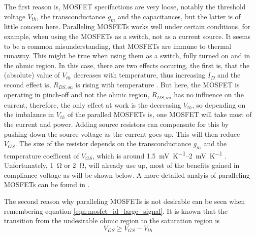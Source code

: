 The first reason is, MOSFET specifactions are very loose, notably the threshold voltage $V_{th}$, the transconductance $g_m$ and the capacitances, but the latter is of little concern here. Paralleling MOSFETs works well under certain conditions, for example, when using the MOSFETs as a switch, not as a current source. It seems to be a common misunderstanding, that MOSFETs are immune to thermal runaway. This might be true when using them as a switch, fully turned on and in the ohmic region. In this case, there are two effects occuring, the first is, that the (absolute) value of $V_{th}$ decreases with temperature, thus increasing $I_D$ and the second effect is, $R_{DS,on}$ is rising with temperature \cite{mosfet_thermal_runaway}. But here, the MOSFET is operating in pinch-off and not the ohmic region, $R_{DS,on}$ has no influence on the current, therefore, the only effect at work is the decreasing $V_{th}$, so depending on the imbalance in $V_{th}$ of the paralled MOSFETs is, one MOSFET will take most of the current and power. Adding source resistors can compensate for this by pushing down the source voltage as the current goes up. This will then reduce $V_{GS}$. The size of the resistor depends on the transconductance $g_m$ and the temperature coefficent of $V_{GS}$, which is around \qtyrange[range-units = single]{1.5}{2}{\mV \per \K} \cite{mosfet_vgs_tempco}. Unfortunately, \qty{1}{\ohm} or \qty{2}{\ohm}, will already use up, most of the benefits gained in compliance voltage as will be shown below. A more detailed analyis of paralleling MOSFETs can be found in \cite{paralleling_mosfets}.

The second reason why paralleling MOSFETs is not desirable can be seen when
remembering equation \ref{eqn:mosfet_id_large_signal}. It is known that the transition from the undesirable ohmic region to the saturation region is
\begin{equation}
    V_{DS} \geq V_{GS} − V_{th}
\end{equation}


